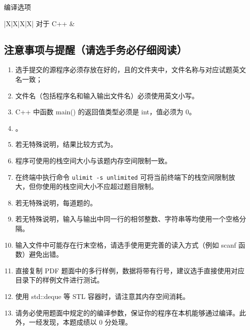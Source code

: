 \documentclass{statement}
\begin{document}
\begin{titlepage}
            编译选项
            \begin{center}
            \begin{tabularx}{\textwidth}{|X|X|X|X|}
            \hline
            对于 C++ & \\
            \hline
            \end{tabularx}\par
            \end{center}

        \begingroup\titleformat{\subsection}{\bf}{}{0pt}{\hspace{0.5em}}\subsection{注意事项与提醒（请选手务必仔细阅读）}\endgroup
        \begin{enumerate}
            \item 选手提交的源程序必须存放在好的，且的文件夹中，文件名称与对应试题英文名一致；
            \item 文件名（包括程序名和输入输出文件名）必须使用英文小写。
            \item C++ 中函数 main() 的返回值类型必须是 int，值必须为 0。
            \item {}。
            \item 若无特殊说明，结果比较方式为。
            \item 程序可使用的栈空间大小与该题内存空间限制一致。
            \item 在终端中执行命令 \texttt{ulimit -s unlimited} 可将当前终端下的栈空间限制放大，但你使用的栈空间大小不应超过题目限制。
            \item 若无特殊说明，每道题的。
            \item 若无特殊说明，输入与输出中同一行的相邻整数、字符串等均使用一个空格分隔。
            \item 输入文件中可能存在行末空格，请选手使用更完善的读入方式（例如 scanf 函数）避免出错。
            \item 直接复制 PDF 题面中的多行样例，数据将带有行号，建议选手直接使用对应目录下的样例文件进行测试。
            \item 使用 std::deque 等 STL 容器时，请注意其内存空间消耗。
            \item 请务必使用题面中规定的的编译参数，保证你的程序在本机能够通过编译。此外，一经发现，本题成绩以 0 分处理。
        \end{enumerate}
    \end{titlepage}
\end{document}
